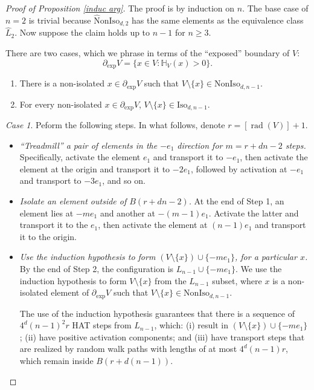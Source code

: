 \documentclass[11pt,reqno]{amsart}
\theoremstyle{definition}
\numberwithin{equation}{section}
\newcommand{\1}{\mathbf{1}}
\renewcommand{\H}{\mathbb{H}}
\DeclareMathOperator{\rad}{rad}
\newcommand{\iso}{\mathrm{Iso}}
\newcommand{\noniso}{\mathrm{NonIso}}
\newcommand{\wtnoniso}{\mathrm{\wt{N}onIso}}
\newcommand{\wt}{\widehat}
\newcommand{\bdye}{\partial_{\mathrm{exp}}}
\begin{document}
\begin{proof}[Proof of Proposition \ref{induc arg}]
The proof is by induction on $n$. The base case of $n=2$ is trivial because $\wtnoniso_{d,2}$ has the same elements as the equivalence class $\wt{L}_2$. Now suppose the claim holds up to $n-1$ for $n \geq 3$.

There are two cases, which we phrase in terms of the ``exposed'' boundary of $V$:
\[ \bdye V = \{x \in V: \H_V (x) > 0\}.\]
\begin{enumerate}
    \item There is a non-isolated $x \in \bdye V$ such that $V{\setminus}\{x\} \in \noniso_{d,n-1}$.
    \item For every non-isolated $x \in \bdye V$, $V {\setminus} \{x\} \in \iso_{d,n-1}$.
\end{enumerate}

 {\em Case 1}. Peform the following steps. In what follows, denote $r = [\rad (V)]+1$.
 \begin{itemize}
 \item[Step 1:] {\em ``Treadmill'' a pair of elements in the $-e_1$ direction for $m = r + dn - 2$ steps.} Specifically, activate the element $e_1$ and transport it to $-e_1$, then activate the element at the origin and transport it to $-2e_1$, followed by activation at $-e_1$ and transport to $-3e_1$, and so on.  

 \item[Step 2:] {\em Isolate an element outside of $B(r+ dn-2)$.} At the end of Step 1, an element lies at $-m e_1$ and another at $-(m-1)e_1$. Activate the latter and transport it to the $e_1$, then activate the element at $(n-1)e_1$ and transport it to the origin. 

 \item[Step 3:] {\em Use the induction hypothesis to form $(V{\setminus}\{x\}) \cup \{-m e_1\}$, for a particular $x$.} By the end of Step 2, the configuration is $L_{n-1} \cup \{-m e_1\}$. 
We use the induction hypothesis to form $V {\setminus} \{x\}$ from the $L_{n-1}$ subset, where $x$ is a non-isolated element of $\bdye V$ such that $V {\setminus} \{x\} \in \noniso_{d,n-1}$.

The use of the induction hypothesis guarantees that there is a sequence of $4^d(n-1)^2 r$ HAT steps from $L_{n-1}$, which: (i) result in $(V{\setminus}\{x\}) \cup \{-m e_1\}$; (ii) have positive activation components; and (iii) have transport steps that are realized by random walk paths with lengths of at most $4^d (n-1) r$, which remain inside $B(r+d(n-1))$.



\end{itemize}
\end{proof}
\end{document}
